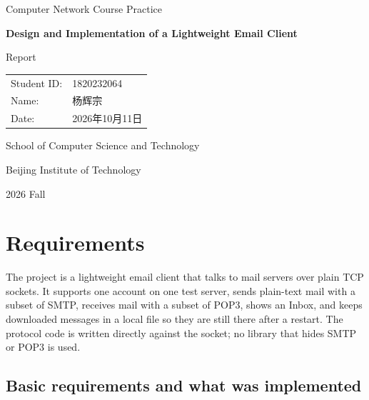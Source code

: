 \documentclass[11pt,a4paper]{article}
\newcommand{\coursename}{Computer Network Course Practice}
\newcommand{\projecttitle}{Design and Implementation of a Lightweight Email Client}
\newcommand{\semester}{2026 Fall}
\newcommand{\schoolname}{School of Computer Science and Technology}
\newcommand{\universityname}{Beijing Institute of Technology}
\newcommand{\studentid}{1820232064}{\rule{7cm}{0.4pt}}
\newcommand{\studentname}{杨辉宗}{\rule{7cm}{0.4pt}}
\newcommand{\reportdate}{2026年10月11日}{\rule{7cm}{0.4pt}}
\begin{document}
\begin{titlepage}
\centering

\vspace*{2cm}

{\Large \coursename\par}

\vspace{2cm}

{\LARGE\bfseries \projecttitle\par}

\vspace{0.8cm}

{\Large Report\par}

\vfill

\begin{tabular}{ll}
Student ID: & \studentid \\[1em]
Name:       & \studentname \\[1em]
Date:       & \reportdate
\end{tabular}

\vfill

{\schoolname\par}
{\universityname\par}

\vspace{0.8cm}

{\semester\par}

\end{titlepage}

\tableofcontents
\newpage

\section{Requirements}

The project is a lightweight email client that talks to mail servers over plain TCP
sockets. It supports one account on one test server, sends plain-text mail with a subset
of SMTP, receives mail with a subset of POP3, shows an Inbox, and keeps downloaded
messages in a local file so they are still there after a restart. The protocol code is
written directly against the socket; no library that hides SMTP or POP3 is used.

\subsection{Basic requirements and what was implemented}
\end{document}
